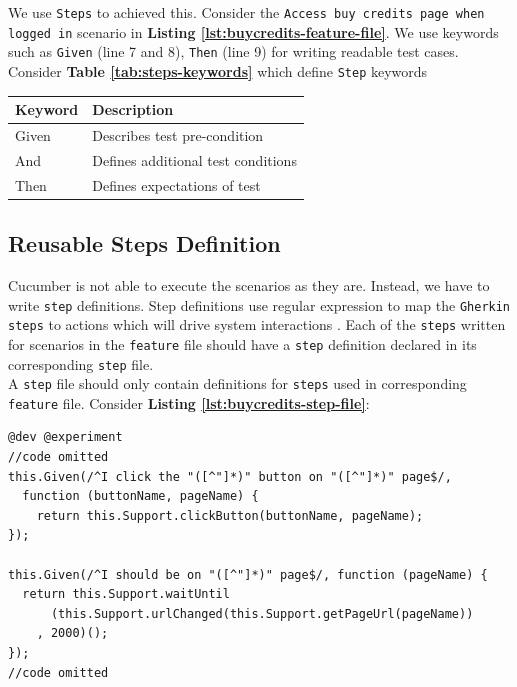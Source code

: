 We use \texttt{Steps} to achieved this. Consider the \texttt{Access buy credits page when logged in} scenario in \textbf{Listing \ref{lst:buycredits-feature-file}}. We use keywords such as \texttt{Given} (line 7 and 8), \texttt{Then} (line 9) for writing readable test cases. Consider \textbf{Table \ref{tab:steps-keywords}} which define \texttt{Step} keywords \cite{featurefile1}

\begin{center}
\begin{tabular}{ |p{2cm}|p{7cm}| }

 \hline
 	Keyword &
 	Description\\
 \hline
 	Given & Describes test pre-condition\\
 \hline
 	And & Defines additional test conditions\\
 \hline
 	Then & Defines expectations of test \\
 \hline

\end{tabular}
\label{tab:steps-keywords}
\end{center}

\subsection{Reusable Steps Definition}
\label{subsec:reusable-steps-definition}

Cucumber is not able to execute the scenarios as they are. Instead, we have to write \texttt{step} definitions. Step definitions use regular expression to map the \texttt{Gherkin steps} to actions which will drive system interactions \cite{stepfile1}. Each of the \texttt{steps} written for scenarios in the \texttt{feature} file should have a \texttt{step} definition declared in its corresponding \texttt{step} file.\\ A \texttt{step} file should only contain definitions for \texttt{steps} used in corresponding \texttt{feature} file. Consider \textbf{Listing \ref{lst:buycredits-step-file}}:\\

\begin{listing}[H]
\begin{verbatim}
@dev @experiment
//code omitted
this.Given(/^I click the "([^"]*)" button on "([^"]*)" page$/,
  function (buttonName, pageName) {
    return this.Support.clickButton(buttonName, pageName);
});

this.Given(/^I should be on "([^"]*)" page$/, function (pageName) {
  return this.Support.waitUntil
      (this.Support.urlChanged(this.Support.getPageUrl(pageName))
    , 2000)();
});
//code omitted
\end{verbatim}
\label{lst:buycredits-step-file}
\end{listing}

